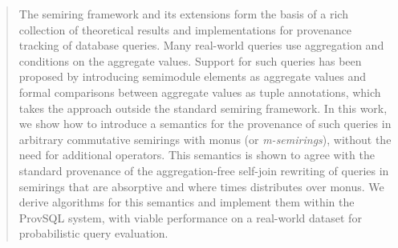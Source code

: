\begin{abstract}
The semiring framework and its extensions form the basis of a rich collection of theoretical
results and implementations for provenance tracking of database queries.
Many real-world queries use aggregation and conditions on the aggregate
values.
Support for such queries has been proposed by introducing semimodule
elements as aggregate values and formal comparisons between aggregate values as tuple
annotations, which takes the approach outside the standard semiring framework. In this work, we
show how to introduce a semantics for the provenance of such queries in
arbitrary commutative semirings with monus (or \emph{m-semirings}), without the need for additional
operators. This semantics is shown to agree with the standard provenance of the
aggregation-free self-join rewriting of  queries in
semirings that are absorptive and where times distributes over monus. We
derive algorithms for this semantics and implement them within the
ProvSQL system, with viable performance on a real-world dataset for
probabilistic query evaluation.
\end{abstract}
